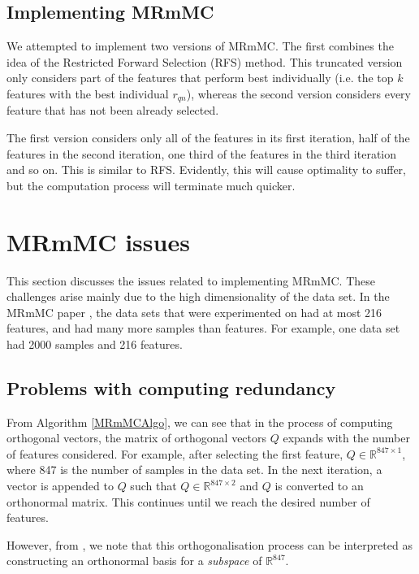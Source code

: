 \documentclass[12pt, twoside, a4paper]{report}
\begin{document}
\subsection{Implementing MRmMC}

We attempted to implement two versions of MRmMC. The first combines the idea of the Restricted Forward Selection (RFS) method. This truncated version only considers part of the features that perform best individually (i.e. the top $k$ features with the best individual $r_{qn}$), whereas the second version considers every feature that has not been already selected.

The first version considers only all of the features in its first iteration, half of the features in the second iteration, one third of the features in the third iteration and so on. This is similar to RFS. Evidently, this will cause optimality to suffer, but the computation process will terminate much quicker.

\section{MRmMC issues} \label{mrmmc:issues}

This section discusses the issues related to implementing MRmMC. These challenges arise mainly due to the high dimensionality of the data set. In the MRmMC paper \cite{RefWorks:187}, the data sets that were experimented on had at most 216 features, and had many more samples than features. For example, one data set had 2000 samples and 216 features.

\subsection{Problems with computing redundancy} \label{mrmmc_probs}

From Algorithm \ref{MRmMCAlgo}, we can see that in the process of computing orthogonal vectors, the matrix of orthogonal vectors $Q$ expands with the number of features considered. For example, after selecting the first feature, $Q \in \mathbb{R}^{847 \times 1}$, where 847 is the number of samples in the data set. In the next iteration, a vector is appended to $Q$ such that $Q \in \mathbb{R}^{847 \times 2}$ and $Q$ is converted to an orthonormal matrix. This continues until we reach the desired number of features.

However, from \cite{RefWorks:253}, we note that this orthogonalisation process can be interpreted as constructing an orthonormal basis for a \textit{subspace} of $\mathbb{R}^{847}$.
\end{document}
